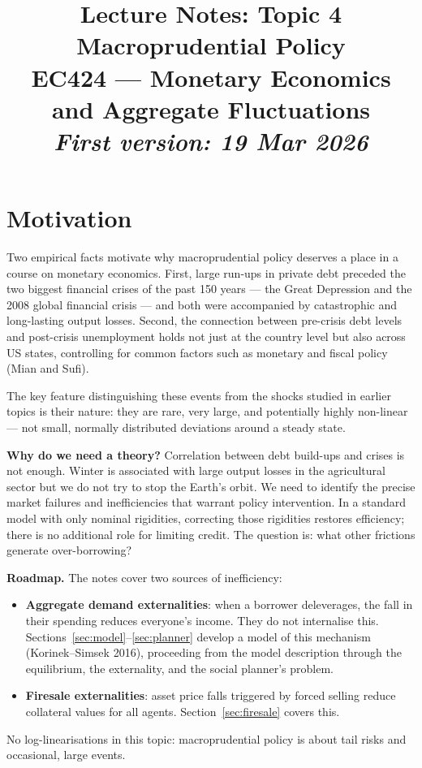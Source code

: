 \documentclass[11pt,a4paper]{article}
\title{\vspace{-2cm}\color{BoEblue}
\textbf{Lecture Notes: Topic 4}\\[0.3em]
\Large Macroprudential Policy\\[0.3em]
\large EC424 --- Monetary Economics and Aggregate Fluctuations\\\bigskip
\large \textit{First version: 19 Mar 2026}
}
\author{}
\date{}
\begin{document}
\maketitle
\tableofcontents
\newpage
\vspace{-1cm}

\section{Motivation}

Two empirical facts motivate why macroprudential policy deserves a place in a course on monetary economics. First, large run-ups in private debt preceded the two biggest financial crises of the past 150 years --- the Great Depression and the 2008 global financial crisis --- and both were accompanied by catastrophic and long-lasting output losses. Second, the connection between pre-crisis debt levels and post-crisis unemployment holds not just at the country level but also across US states, controlling for common factors such as monetary and fiscal policy (Mian and Sufi).

The key feature distinguishing these events from the shocks studied in earlier topics is their nature: they are rare, very large, and potentially highly non-linear --- not small, normally distributed deviations around a steady state.

\textbf{Why do we need a theory?} Correlation between debt build-ups and crises is not enough. Winter is associated with large output losses in the agricultural sector but we do not try to stop the Earth's orbit. We need to identify the precise market failures and inefficiencies that warrant policy intervention. In a standard model with only nominal rigidities, correcting those rigidities restores efficiency; there is no additional role for limiting credit. The question is: what other frictions generate over-borrowing?

\textbf{Roadmap.} The notes cover two sources of inefficiency:
\begin{itemize}
    \item \textbf{Aggregate demand externalities}: when a borrower deleverages, the fall in their spending reduces everyone's income. They do not internalise this. Sections~\ref{sec:model}--\ref{sec:planner} develop a model of this mechanism (Korinek--Simsek 2016), proceeding from the model description through the equilibrium, the externality, and the social planner's problem.
    \item \textbf{Firesale externalities}: asset price falls triggered by forced selling reduce collateral values for all agents. Section~\ref{sec:firesale} covers this.
\end{itemize}
No log-linearisations in this topic: macroprudential policy is about tail risks and occasional, large events.
\end{document}
